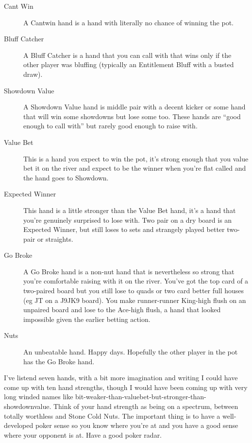 \begin{description}

\item[Cant Win] A Cantwin hand is a hand with literally no chance of
winning the pot.

\item[Bluff Catcher] A Bluff Catcher is a hand that you can call with
that wins only if the other player was bluffing (typically an
Entitlement Bluff with a busted draw).

\item[Showdown Value] A Showdown Value hand is middle pair with a
decent kicker or some hand that will win some showdowns but lose some
too. These hands are ``good enough to call with'' but rarely good
enough to raise with.

\item[Value Bet] This is a hand you expect to win the pot, it's strong
enough that you value bet it on the river and expect to be the winner
when you're flat called and the hand goes to Showdown.

\item[Expected Winner] This hand is a little stronger than the Value
Bet hand, it's a hand that you're genuinely surprised to lose
with. Two pair on a dry board is an Expected Winner, but still loses
to sets and strangely played better two-pair or straights.

\item[Go Broke] A Go Broke hand is a non-nut hand that is nevertheless
so strong that you're comfortable raising with it on the river. You've
got the top card of a two-paired board but you still lose to quads or
two card better full houses (eg JT on a J9JK9 board). You make
runner-runner King-high flush on an unpaired board and lose to the
Ace-high flush, a hand that looked impossible given the earlier
betting action.

\item[Nuts] An unbeatable hand. Happy days. Hopefully the other player
in the pot has the Go Broke hand.

\end{description}


I've listend seven hands, with a bit more imagination and writing
I could have come up with ten hand strengths, though I would have been
coming up with very long winded names like
bit-weaker-than-valuebet-but-stronger-than-showdownvalue. Think of
your hand strength as being on a spectrum, between totally
worthless and Stone Cold Nuts. The important thing is to have
a well-developed poker sense so you know where you're at and you
have a good sense where your opponent is at. Have a good poker radar.


